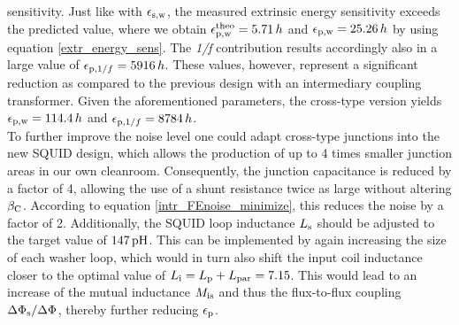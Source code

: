 sensitivity. Just like with $\epsilon_{\rm s,w}$, the measured extrinsic energy sensitivity exceeds the predicted value, where we obtain $\epsilon_{\rm p,w}^{\rm theo}=5.71\, h$ and $\epsilon_{\rm p,w}=25.26\, h$ by using equation \ref{extr_energy_sens}. The \textit{1/f} contribution results accordingly also in a large value of $\epsilon_{{\rm p},1/f}=5916\, h$. These values, however, represent a significant reduction as compared to the previous design with an intermediary coupling transformer. Given the aforementioned parameters, the cross-type version yields $\epsilon_{\rm p,w}=114.4\, h$ and $\epsilon_{{\rm p},1/f}=8784\, h$. \\

To further improve the noise level one could adapt cross-type junctions into the new SQUID design, which allows the production of up to 4 times smaller junction areas in our own cleanroom. Consequently, the junction capacitance is reduced by a factor of 4, allowing the use of a shunt resistance twice as large without altering $\beta_{\rm C}$. According to equation \ref{intr_FEnoise_minimize}, this reduces the noise by a factor of 2. Additionally, the SQUID loop inductance $L_{\rm s}$ should be adjusted to the target value of $\qty{147}{\pH}$. This can be implemented by again increasing the size of each washer loop, which would in turn also shift the input coil inductance closer to the optimal value of $L_{\rm i}=L_{\rm p}+L_{\rm par}=7.15$. This would lead to an increase of the mutual inductance $M_{\rm is}$ and thus the flux-to-flux coupling $\Delta\Phi_{\rm s}/\Delta\Phi_{\rm }$, thereby further reducing $\epsilon_{\rm p}$.               


